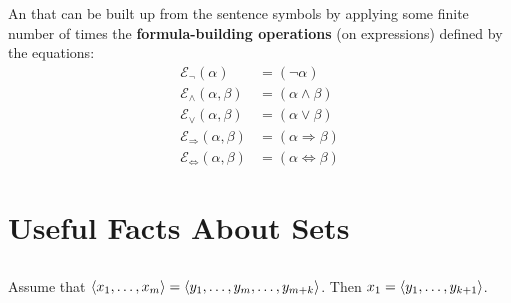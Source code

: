 \documentclass{report}
\begin{document}
  An  that can be built up from the sentence symbols by
    applying some finite number of times the
    \textbf{formula-building operations} (on expressions) defined by the
    equations:
    \begin{align*}
      \mathcal{E}_{\neg}(\alpha)
        & = (\neg \alpha) \\
      \mathcal{E}_{\land}(\alpha, \beta)
        & = (\alpha \land \beta) \\
      \mathcal{E}_{\lor}(\alpha, \beta)
        & = (\alpha \lor \beta) \\
      \mathcal{E}_{\Rightarrow}(\alpha, \beta)
        & = (\alpha \Rightarrow \beta) \\
      \mathcal{E}_{\Leftrightarrow}(\alpha, \beta)
        & = (\alpha \Leftrightarrow \beta)
    \end{align*}

\endgroup

\setcounter{chapter}{0}
\addtocounter{chapter}{-1}
\chapter{Useful Facts About Sets}%

\section{}%

  \begin{lemma}[0A]
    Assume that $\left< x_1, \ldots, x_m \right> = \left< y_1, \ldots, y_m, \ldots, y_{m+k} \right>$.
    Then $x_1 = \left< y_1, \ldots, y_{k+1} \right>$.
  \end{lemma}
\end{document}
